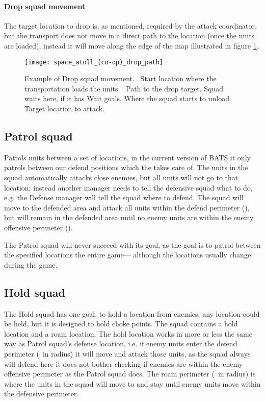 \paragraph{Drop squad movement}
The target location to drop is, as mentioned, required by the attack coordinator, but the transport
does not move in a direct path to the location (once the units are loaded), instead it will move
along the edge of the map illustrated in figure \ref{fig:drop_squad_movement}.
\begin{figure}[htb]
\centering
\texttt{[image: space\_atoll\_(co-op)\_drop\_path]}
\caption[Drop squad movement example]{Example of Drop squad movement.
\usebox{\LegendDotGreen}~Start location where the transportation loads the units.
\usebox{\LegendLineCyan}~Path to the drop target.
\usebox{\LegendDotOrange}Squad waits here, if it has Wait goals.
\usebox{\LegendDotYellow}Where the squad starts to unload.
\usebox{\LegendDotRed}Target location to attack.}
\label{fig:drop_squad_movement}
\end{figure}

\subsection{Patrol squad}
\label{sec:patrol_squad}
Patrols units between a set of locations, in the current version of BATS it only patrols between our
defend positions which the  takes care of. The units in the squad
automatically attacks close enemies, but all units will not go to that location; instead another
manager needs to tell the defensive squad what to do, e.g. the Defense manager will tell the squad
where to defend. The squad will move to the defended area and attack all units within the defend
perimeter (\squadDefendDefendPerimeter), but will remain in the defended area until no enemy units
are within the enemy offensive perimeter (\squadDefendEnemyOffensivePerimeter).

The Patrol squad will never succeed with its goal, as the goal is to patrol between the specified
locations the entire game— although the locations usually change during the game.

\subsection{Hold squad}
\label{sec:hold_squad}
The Hold squad has one goal, to hold a location from enemies; any location could be held, but it is
designed to hold choke points. The squad contains a hold location and a roam location. The hold
location works in more or less the same way as Patrol squad's defense location, i.e. if enemy units
enter the defend perimeter (\squadDefendDefendPerimeter~in radius) it will move and attack those
units, as the squad always will defend here it does not bother checking if enemies are within the
enemy offensive perimeter as the Patrol squad does. The roam perimeter (\squadDefendRoamPerimeter~in
radius) is where the units in the squad will move to and stay until enemy units move within the
defensive perimeter.

